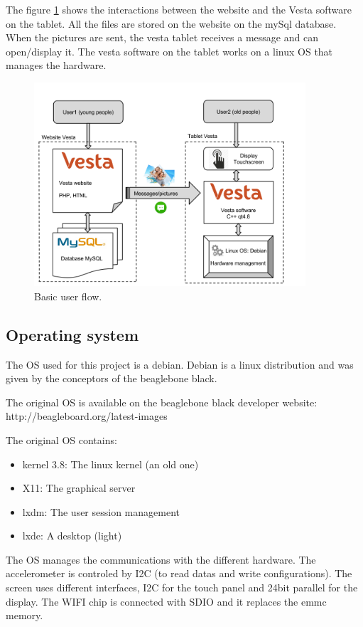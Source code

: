The figure \ref{fig:user flow} shows the interactions between the website and the Vesta software on the tablet. All the files are stored on the website on the mySql database. When the pictures are sent, the vesta tablet receives a message and can open/display it. The vesta software on the tablet works on a linux OS that manages the hardware.

\begin{figure}[!htb]
    \centering
    \includegraphics[width=0.9\textwidth,keepaspectratio]{chap/softFig/block_diagram_vesta2.png}
    \caption{Basic user flow.}
    \label{fig:user flow}
\end{figure}

\subsection{Operating system}
The OS used for this project is a debian. Debian is a linux distribution and was given by the conceptors of the beaglebone black.

The original OS is available on the beaglebone black developer website: http://beagleboard.org/latest-images

The original OS contains:
\begin{itemize}
\item{kernel 3.8: The linux kernel (an old one)}
\item{X11: The graphical server}
\item{lxdm: The user session management}
\item{lxde: A desktop (light)}
\end{itemize}

The OS manages the communications with the different hardware. The accelerometer is controled by I2C (to read datas and write configurations). The screen uses different interfaces, I2C for the touch panel and 24bit parallel for the display. The WIFI chip is connected with SDIO and it replaces the emmc memory.


